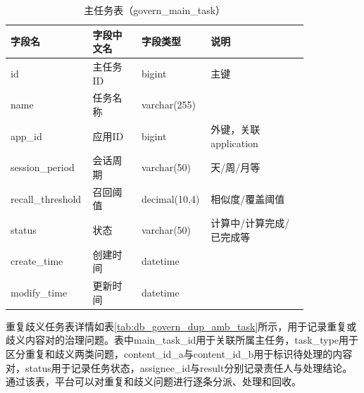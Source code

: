 \begin{table}[!htbp]
  \centering
  \caption{主任务表（govern\_main\_task）}
  \label{tab:db_govern_main_task}
  \small
  \begin{tabular}{>{\raggedright\arraybackslash}p{0.20\linewidth}|>{\raggedright\arraybackslash}p{0.16\linewidth}|>{\raggedright\arraybackslash}p{0.16\linewidth}|>{\raggedright\arraybackslash}p{0.32\linewidth}}
    \hline
    字段名 & 字段中文名 & 字段类型 & 说明 \\ \hline
    id & 主任务ID & bigint & 主键 \\ \hline
    name & 任务名称 & varchar(255) & \\ \hline
    app\_id & 应用ID & bigint & 外键，关联application \\ \hline
    session\_period & 会话周期 & varchar(50) & 天/周/月等 \\ \hline
    recall\_threshold & 召回阈值 & decimal(10,4) & 相似度/覆盖阈值 \\ \hline
    status & 状态 & varchar(50) & 计算中/计算完成/已完成等 \\ \hline
    create\_time & 创建时间 & datetime & \\ \hline
    modify\_time & 更新时间 & datetime & \\ \hline
  \end{tabular}
\end{table}

重复歧义任务表详情如表\ref{tab:db_govern_dup_amb_task}所示，用于记录重复或歧义内容对的治理问题。表中main\_\allowbreak task\_\allowbreak id用于关联所属主任务，task\_\allowbreak type用于区分重复和歧义两类问题，content\_\allowbreak id\_\allowbreak a与content\_\allowbreak id\_\allowbreak b用于标识待处理的内容对，status用于记录任务状态，assignee\_\allowbreak id与result分别记录责任人与处理结论。通过该表，平台可以对重复和歧义问题进行逐条分派、处理和回收。

